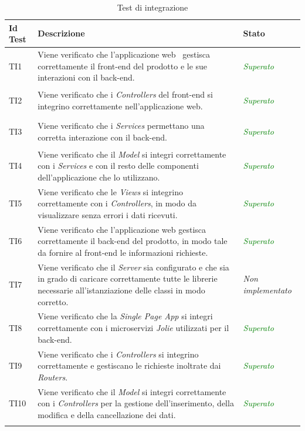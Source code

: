 	\normalsize
	\begin{longtable}{|>{\centering\arraybackslash}p{1.5cm}|>{\centering\arraybackslash}p{8cm} | >{\centering\arraybackslash}p{3.8cm}|}
		\hline \rowcolor{Gray}
		\textbf{Id Test} & \textbf{Descrizione} & \textbf{Stato}\\
		\hline
		\endhead
		\hypertarget{TI1}{TI1} & Viene verificato che l’applicazione web \progetto\ gestisca
		correttamente il front-end del prodotto e le sue interazioni con il back-end. & \textcolor{Green}{\textit{Superato}}\\ \hline
		\hypertarget{TI2}{TI2} & Viene verificato che i \textit{Controllers} del front-end si integrino
		correttamente nell’applicazione web. & \textcolor{Green}{\textit{Superato}}\\ \hline
		\hypertarget{TI3}{TI3} & Viene verificato che i \textit{Services} permettano una corretta interazione con il back-end. & \textcolor{Green}{\textit{Superato}}\\ \hline
		\hypertarget{TI4}{TI4} & Viene verificato che il \textit{Model} si integri correttamente con i
		\textit{Services} e con il resto delle componenti dell’applicazione che lo utilizzano. & \textcolor{Green}{\textit{Superato}}\\ \hline
		\hypertarget{TI5}{TI5} & Viene verificato che le \textit{Views} si integrino correttamente con i
		\textit{Controllers}, in modo da visualizzare senza errori i dati ricevuti. & \textcolor{Green}{\textit{Superato}}\\ \hline
		\hypertarget{TI6}{TI6} & Viene verificato che l’applicazione web gestisca	correttamente il back-end del prodotto, in modo tale da fornire al front-end le informazioni richieste. & \textcolor{Green}{\textit{Superato}}\\ \hline
		\hypertarget{TI7}{TI7} & Viene verificato che il \textit{Server} sia configurato e che sia in grado di caricare correttamente tutte le librerie necessarie all'istanziazione delle classi in modo corretto. & \textit{Non implementato}\\ \hline
		\hypertarget{TI8}{TI8} & Viene verificato che la \textit{Single Page App} si integri correttamente con i microservizi \textit{Jolie} utilizzati per il back-end. & \textcolor{Green}{\textit{Superato}}\\ \hline
		\hypertarget{TI9}{TI9} & Viene verificato che i \textit{Controllers} si integrino correttamente
		e gestiscano le richieste inoltrate dai \textit{Routers}. & \textcolor{Green}{\textit{Superato}}\\ \hline
		\hypertarget{TI10}{TI10} & Viene verificato che il \textit{Model} si integri correttamente con i
		\textit{Controllers} per la gestione dell’inserimento, della modifica e della cancellazione dei dati. & \textcolor{Green}{\textit{Superato}}\\ \hline
		\caption[Test di integrazione]{Test di integrazione}
		\label{tabella:test1}
	\end{longtable}

